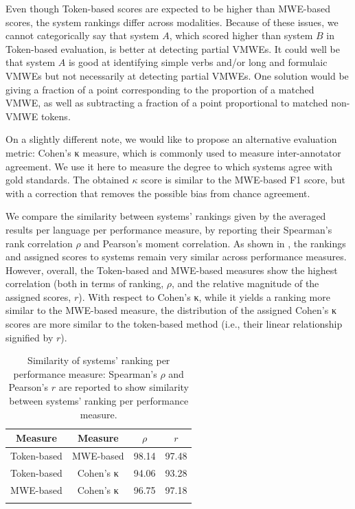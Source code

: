 \documentclass[output=paper,modfonts,nonflat,draftmode]{langsci/langscibook}
\begin{document}
Even though Token-based scores are expected to be higher than MWE-based scores, the system rankings differ across modalities. Because of these issues, we cannot categorically say that system $A$, which scored higher than system $B$ in Token-based evaluation, is better at detecting partial VMWEs. It could well be that system $A$ is good at identifying simple verbs and/or long and formulaic VMWEs but not necessarily at detecting partial VMWEs. One solution would be giving a fraction of a point corresponding to the proportion of a matched VMWE, as well as subtracting a fraction of a point proportional to matched non-VMWE tokens. 

On a slightly different note, we would like to propose an alternative evaluation metric: Cohen's κ measure, which is commonly used to measure inter-annotator agreement. We use it here to measure the degree to which systems agree with gold standards. The obtained $\kappa$ score is similar to the MWE-based F1 score, but with a correction that removes the possible bias from chance agreement. 

We compare the similarity between systems' rankings given by the averaged results per language per performance measure, by reporting their Spearman's rank correlation $\rho$ and Pearson's moment correlation. As shown in , the rankings and assigned scores to systems remain very similar across performance measures. However, overall, the Token-based and MWE-based measures show the highest correlation (both in terms of ranking, $\rho$, and the relative magnitude of the assigned scores, $r$). With respect to Cohen's κ, while it yields a ranking more similar to the MWE-based measure, the distribution of the assigned Cohen's κ scores are more similar to the token-based method (i.e., their linear relationship signified by $r$).

\begin{table}
\centering
\caption{Similarity of systems' ranking per performance measure: Spearman's $\rho$ and Pearson's $r$ %
are reported to show similarity between systems' ranking per performance measure.}
\label{similarity-of-measures}
\begin{tabular}{cccc}%
\lsptoprule
Measure & Measure & $\rho$ & $r$ \tabularnewline
\midrule
Token-based & MWE-based        & 98.14 & 97.48 \tabularnewline
Token-based & Cohen's κ & 94.06 & 93.28 \tabularnewline
MWE-based   & Cohen's κ & 96.75 & 97.18 \tabularnewline
\lspbottomrule
\end{tabular}
\end{table}
\end{document}
